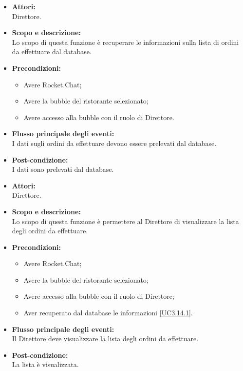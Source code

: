 \begin{itemize}
	\item \textbf{Attori:}
	\\Direttore.
	\item \textbf{Scopo e descrizione:} 
	\\Lo scopo di questa funzione è recuperare le informazioni sulla lista di ordini da effettuare dal database.
	\item \textbf{Precondizioni:}
	\begin{itemize}
		\item Avere Rocket.Chat;
		\item Avere la bubble del ristorante selezionato;
		\item Avere accesso alla bubble con il ruolo di Direttore.
	\end{itemize}
	\item \textbf{Flusso principale degli eventi:}
	\\I dati sugli ordini da effettuare devono essere prelevati dal database.
	\item \textbf{Post-condizione:}
	\\I dati sono prelevati dal database.
\end{itemize}


\begin{itemize}
	\item \textbf{Attori:}
	\\Direttore.
	\item \textbf{Scopo e descrizione:} 
	\\Lo scopo di questa funzione è permettere al Direttore di visualizzare la lista degli ordini da effettuare.
	\item \textbf{Precondizioni:}
	\begin{itemize}
		\item Avere Rocket.Chat;
		\item Avere la bubble del ristorante selezionato;
		\item Avere accesso alla bubble con il ruolo di Direttore;
		\item Aver recuperato dal database le informazioni \ref{UC3.14.1}.
	\end{itemize}
	\item \textbf{Flusso principale degli eventi:}
	\\Il Direttore deve visualizzare la lista degli ordini da effettuare.
	\item \textbf{Post-condizione:}
	\\La lista è visualizzata.
\end{itemize}

